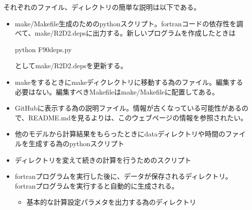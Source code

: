 \documentclass[letterpaper,10pt,dvipdfmx,report]{sphinxmanual}
\begin{document}
\sphinxAtStartPar
それぞれのファイル、ディレクトリの簡単な説明は以下である。
\begin{itemize}
\item {} \begin{description}
\sphinxAtStartPar
make/Makefile生成のためのpythonスクリプト。fortranコードの依存性を調べて、make/R2D2.depsに出力する。新しいプログラムを作成したときは

\begin{sphinxVerbatim}[commandchars=\\\{\}]
python F90\PYGZus{}deps.py
\end{sphinxVerbatim}

\sphinxAtStartPar
としてmake/R2D2.depsを更新する。

\end{description}

\item {} \begin{description}
\sphinxAtStartPar
makeをするときにmakeディクレクトリに移動する為のファイル。編集する必要はない。編集すべきMakefileはmake/Makefileに配置してある。

\end{description}

\item {} \begin{description}
\sphinxAtStartPar
GitHubに表示する為の説明ファイル。情報が古くなっている可能性があるので、README.mdを見るよりは、このウェブページの情報を参照されたい。

\end{description}

\item {} \begin{description}
\sphinxAtStartPar
他のモデルから計算結果をもらったときにdataディレクトリや時間のファイルを生成する為のpythonスクリプト

\end{description}

\item {} \begin{description}
\sphinxAtStartPar
ディレクトリを変えて続きの計算を行うためのスクリプト

\end{description}

\item {} \begin{description}
\sphinxAtStartPar
fortranプログラムを実行した後に、データが保存されるディレクトリ。fortranプログラムを実行すると自動的に生成される。
\begin{itemize}
\item {} \begin{description}
\sphinxAtStartPar
基本的な計算設定パラメタを出力する為のディレクトリ


\end{description}
\end{itemize}
\end{description}
\end{itemize}
\end{document}
